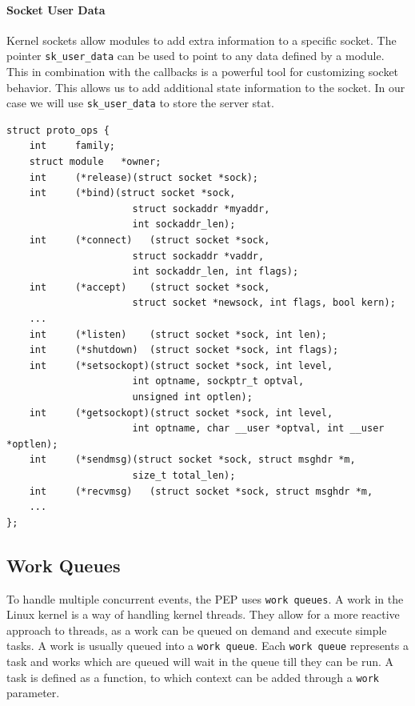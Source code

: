\documentclass[a4paper,english, 12pt]{report}
\begin{document}
\paragraph{Socket User Data}
Kernel sockets allow modules to add extra information to a specific socket. The pointer \verb|sk_user_data| can be used to point to any data defined by a module. This in combination with the callbacks is a powerful tool for customizing socket behavior. This allows us to add additional state information to the socket. In our case we will use \verb|sk_user_data| to store the server stat.\\

\noindent\begin{minipage}{\linewidth}
\begin{verbatim}
struct proto_ops {
    int		family;
    struct module	*owner;
    int		(*release)(struct socket *sock);
    int		(*bind)(struct socket *sock,
    			      struct sockaddr *myaddr,
    			      int sockaddr_len);
    int		(*connect)   (struct socket *sock,
    			      struct sockaddr *vaddr,
    			      int sockaddr_len, int flags);
    int		(*accept)    (struct socket *sock,
    			      struct socket *newsock, int flags, bool kern);
    ...
    int		(*listen)    (struct socket *sock, int len);
    int		(*shutdown)  (struct socket *sock, int flags);
    int		(*setsockopt)(struct socket *sock, int level,
    			      int optname, sockptr_t optval,
    			      unsigned int optlen);
    int		(*getsockopt)(struct socket *sock, int level,
    			      int optname, char __user *optval, int __user *optlen);
    int		(*sendmsg)(struct socket *sock, struct msghdr *m,
    			      size_t total_len);
    int		(*recvmsg)   (struct socket *sock, struct msghdr *m,
    ...
};
\end{verbatim}
\label{fig:proto_ops}
\end{minipage}

\subsection{Work Queues}
To handle multiple concurrent events, the PEP uses \verb|work queues|. A work in the Linux kernel is a way of handling kernel threads. They allow for a more reactive approach to threads, as a work can be queued on demand and execute simple tasks. A work is usually queued into a \verb|work queue|. Each \verb|work queue| represents a task and works which are queued will wait in the queue till they can be run. A task is defined as a function, to which context can be added through a \verb|work| parameter.\\
\end{document}
